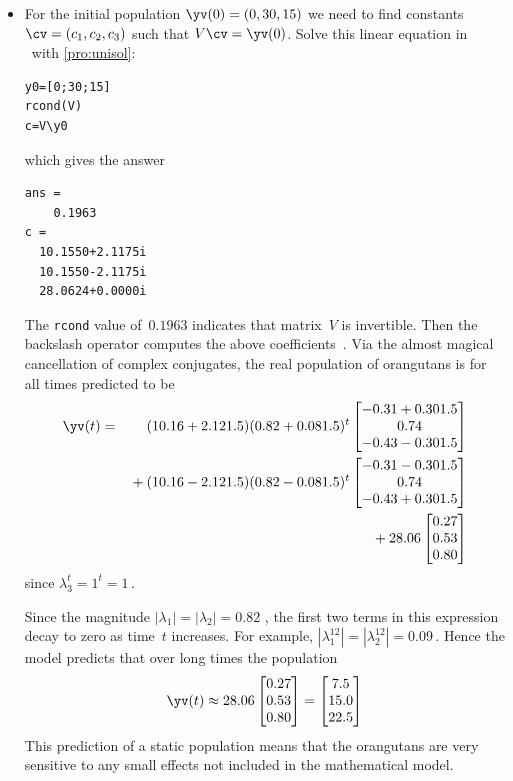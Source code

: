 \begin{example}
\begin{solution}
\begin{equation*}
\end{equation*}
\begin{itemize}
\item For the initial population \(\yv(0)=(0,30,15)\) we need to find constants \(\cv=(c_1,c_2,c_3)\) such that \(V\cv=\yv(0)\).
Solve this linear equation in \script\ with \cref{pro:unisol}:
\begin{verbatim}
y0=[0;30;15]
rcond(V)
c=V\y0
\end{verbatim}
which gives the answer
\begin{verbatim}
ans =
    0.1963
c =
  10.1550+2.1175i
  10.1550-2.1175i
  28.0624+0.0000i
\end{verbatim}
The \verb|rcond| value of~\(0.1963\) indicates that matrix~\(V\) is invertible.
Then the backslash operator computes the above coefficients~\cv.
Via the almost magical cancellation of complex conjugates, the real population of orangutans is for all times predicted to be \twodp
\begin{eqnarray*}
\yv(t)&=&(10.16+2.12\i)(0.82+0.08\i)^t\begin{bmatrix} -0.31+0.30\i   \\0.74
\\-0.43-0.30\i \end{bmatrix}
\\&&{}
+(10.16-2.12\i)(0.82-0.08\i)^t\begin{bmatrix} -0.31-0.30\i   \\0.74
\\-0.43+0.30\i \end{bmatrix}
\\&&{}
+28.06\begin{bmatrix} 0.27
\\0.53
\\0.80 \end{bmatrix}
\end{eqnarray*}
since \(\lambda_3^t=1^t=1\)\,.

Since the magnitude \(|\lambda_1|=|\lambda_2|=0.82\) \twodp, 
the first two terms in this expression decay to zero as time~\(t\) increases.
For example, \(|\lambda_1^{12}|=|\lambda_2^{12}|=0.09\)\,.
Hence the model predicts that over long times the population
\begin{equation*}
\yv(t)\approx 28.06\begin{bmatrix} 0.27
\\0.53
\\0.80 \end{bmatrix}
=\begin{bmatrix} 7.5\\15.0\\22.5 \end{bmatrix}
\end{equation*}
This prediction of a static population means that the orangutans are very sensitive to any small effects not included in the mathematical model.


\end{itemize}
\end{solution}
\end{example}
